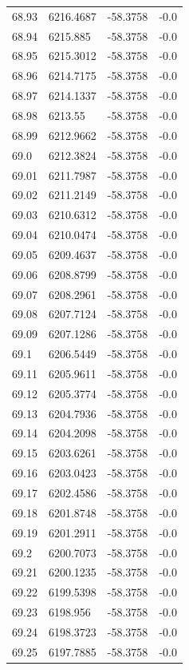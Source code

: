 \begin{table}[H]
\begin{tabular}{llll}
68.93 & 6216.4687 & -58.3758 & -0.0 \\
68.94 & 6215.885 & -58.3758 & -0.0 \\
68.95 & 6215.3012 & -58.3758 & -0.0 \\
68.96 & 6214.7175 & -58.3758 & -0.0 \\
68.97 & 6214.1337 & -58.3758 & -0.0 \\
68.98 & 6213.55 & -58.3758 & -0.0 \\
68.99 & 6212.9662 & -58.3758 & -0.0 \\
69.0 & 6212.3824 & -58.3758 & -0.0 \\
69.01 & 6211.7987 & -58.3758 & -0.0 \\
69.02 & 6211.2149 & -58.3758 & -0.0 \\
69.03 & 6210.6312 & -58.3758 & -0.0 \\
69.04 & 6210.0474 & -58.3758 & -0.0 \\
69.05 & 6209.4637 & -58.3758 & -0.0 \\
69.06 & 6208.8799 & -58.3758 & -0.0 \\
69.07 & 6208.2961 & -58.3758 & -0.0 \\
69.08 & 6207.7124 & -58.3758 & -0.0 \\
69.09 & 6207.1286 & -58.3758 & -0.0 \\
69.1 & 6206.5449 & -58.3758 & -0.0 \\
69.11 & 6205.9611 & -58.3758 & -0.0 \\
69.12 & 6205.3774 & -58.3758 & -0.0 \\
69.13 & 6204.7936 & -58.3758 & -0.0 \\
69.14 & 6204.2098 & -58.3758 & -0.0 \\
69.15 & 6203.6261 & -58.3758 & -0.0 \\
69.16 & 6203.0423 & -58.3758 & -0.0 \\
69.17 & 6202.4586 & -58.3758 & -0.0 \\
69.18 & 6201.8748 & -58.3758 & -0.0 \\
69.19 & 6201.2911 & -58.3758 & -0.0 \\
69.2 & 6200.7073 & -58.3758 & -0.0 \\
69.21 & 6200.1235 & -58.3758 & -0.0 \\
69.22 & 6199.5398 & -58.3758 & -0.0 \\
69.23 & 6198.956 & -58.3758 & -0.0 \\
69.24 & 6198.3723 & -58.3758 & -0.0 \\
69.25 & 6197.7885 & -58.3758 & -0.0 \\

\end{tabular}
\end{table}
